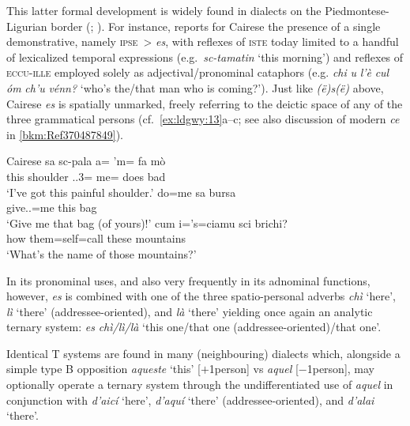 \documentclass[output=paper]{langsci/langscibook}
\begin{document}
This latter formal development is widely found in dialects on the
Piedmontese-Ligurian border (\citealt[251]{Forner:1997a};
\citealt[98f]{Irsara:2009a}). For instance,
\textcites{Parry:1991a}[150--153]{Parry:2005a} reports for Cairese the presence
of a single demonstrative, namely \textsc{ipse}~> \emph{es}, with reflexes of
\textsc{iste} today limited to a handful of lexicalized temporal expressions
(e.g.\ \emph{sc-tamatin} ‘this morning’) and reflexes of \textsc{eccu-ille}
employed solely as adjectival/pronominal cataphors (e.g. \emph{chi} \emph{u}
\emph{l’è} \emph{cul} \emph{óm} \emph{ch’u} \emph{vénn?} ‘who’s the/that man
who is coming?’). Just like \emph{(ë)s(ë)} above, Cairese \emph{es} is
spatially unmarked, freely referring to the deictic space of any of the three
grammatical persons (cf.\ \ref{ex:ldgwy:13}a--c; see also discussion of
modern  \emph{ce} in \cref{bkm:Ref370487849}).

\ea\label{bkm:Ref370498976}\label{ex:ldgwy:13}Cairese \citep{Parry:1991a,Parry:2005a}
    \ea
    \gll  sa  sc-pala a= ’m= fa  mò\\
             this  shoulder  \Sbj{}.\Cl{}.3=  me=  does  bad\\
    \glt \enquote*{I’ve got this painful shoulder.}
    \ex
    \gll  do=me  sa  bursa\\
             give.\Imp{}.\Ssg{}=me  this  bag\\
    \glt \enquote*{Give me that bag (of yours)!}
    \ex
    \gll  cum  i=’s=ciamu  sci  brichi?\\
             how  them=self=call  these  mountains\\
    \glt \enquote*{What’s the name of those mountains?}
    \z
\z

In its pronominal uses, and also very frequently in its adnominal functions,
however, \emph{es} is combined with one of the three spatio-personal adverbs
\emph{chì} ‘here’, \emph{lì} ‘there’ (addressee-oriented), and \emph{là}
‘there’ yielding once again an analytic ternary system: \emph{es}
\emph{chì/lì/là} ‘this one/that one (addressee-oriented)/that one’.

Identical T systems are found in many (neighbouring)  dialects
\citep[21]{CollegidOccitania} which, alongside a simple type B
opposition \emph{aqueste} ‘this’ [$+$1person] vs \emph{aquel}
[$-$1person], may optionally operate a ternary system through the
undifferentiated use of \emph{aquel} in conjunction with \emph{d’aicí} ‘here’,
\emph{d’aquí} ‘there’ (addressee-oriented), and \emph{d’alai} ‘there’.
\end{document}
